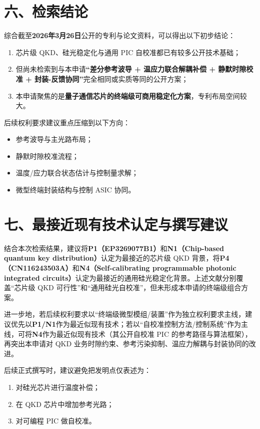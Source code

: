 \documentclass[12pt,a4paper]{article}
\begin{document}
\section*{六、检索结论}

综合截至\textbf{2026年3月26日}公开的专利与论文资料，可以得出以下初步结论：
\begin{enumerate}[label=(\arabic*)]
    \item 芯片级 QKD、硅光稳定化与通用 PIC 自校准都已有较多公开技术基础；
    \item 但尚未检索到与本申请\textbf{“差分参考波导 + 温应力联合解耦补偿 + 静默时隙校准 + 封装-反馈协同”}完全相同或实质等同的公开方案；
    \item 本申请聚焦的是\textbf{量子通信芯片的终端级可商用稳定化方案}，专利布局空间较大。
\end{enumerate}

后续权利要求建议重点压缩到以下方向：
\begin{itemize}[leftmargin=2em]
    \item 参考波导与主光路布局；
    \item 静默时隙校准流程；
    \item 温度/应力联合状态估计与控制量求解；
    \item 微型终端封装结构与控制 ASIC 协同。
\end{itemize}

\section*{七、最接近现有技术认定与撰写建议}

结合本次检索结果，建议将\textbf{P1（EP3269077B1）}和\textbf{N1（Chip-based quantum key distribution）}认定为最接近的芯片级 QKD 背景，将\textbf{P4（CN116243503A）}和\textbf{N4（Self-calibrating programmable photonic integrated circuits）}认定为最接近的通用硅光稳定化背景。上述文献分别覆盖“芯片级 QKD 可行性”和“通用硅光自校准”，但未形成本申请的终端级组合方案。

进一步地，若后续权利要求以“终端级微型模组/装置”作为独立权利要求主线，建议优先以\textbf{P1/N1}作为最近似现有技术；若以“自校准控制方法/控制系统”作为主线，可将\textbf{N4}作为最近似现有技术（其公开自校准 PIC 的参考路径与算法框架），再突出本申请对 QKD 业务时隙约束、参考污染抑制、温应力解耦与封装协同的改进。

后续正式撰写时，建议避免把发明点仅表述为：
\begin{enumerate}[label=(\arabic*)]
    \item 对硅光芯片进行温度补偿；
    \item 在 QKD 芯片中增加参考光路；
    \item 对可编程 PIC 做自校准。
\end{enumerate}
\end{document}

